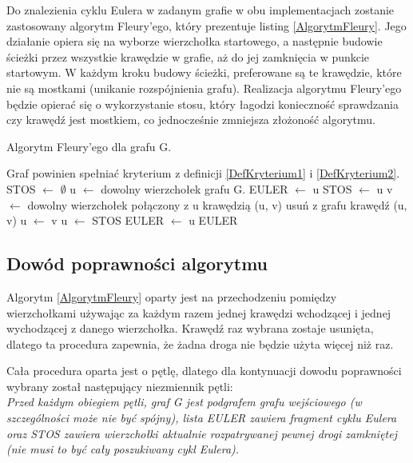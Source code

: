 Do znalezienia cyklu Eulera w zadanym grafie w obu implementacjach zostanie zastosowany algorytm Fleury'ego, który prezentuje listing \ref{AlgorytmFleury}.
Jego działanie opiera się na wyborze wierzchołka startowego, a następnie budowie ścieżki przez wszystkie krawędzie w grafie, aż do jej zamknięcia w punkcie startowym. 
W każdym kroku budowy ścieżki, preferowane są te krawędzie, które nie są mostkami (unikanie rozspójnienia grafu).
Realizacja algorytmu Fleury'ego będzie opierać się o wykorzystanie stosu, który łagodzi konieczność sprawdzania czy krawędź jest mostkiem, co jednocześnie zmniejsza złożoność algorytmu.

\begin{algorithm}
\caption{Algorytm Fleury'ego dla grafu G.}
\label{AlgorytmFleury}
\begin{algorithmic}
\Require Graf powinien spełniać kryterium z definicji \ref{DefKryterium1} i \ref{DefKryterium2}.
\State STOS $\gets$ $\emptyset$
\State u $\gets$ dowolny wierzchołek grafu G.
\State EULER $\gets$  u
\State
\Repeat
		\State STOS $\gets$ u
		\State v $\gets$ dowolny wierzchołek połączony z u krawędzią (u, v)
		\State usuń z grafu krawędź (u, v)
		\State u $\gets$ v
	\Else
		\State u $\gets$ STOS
		\State EULER $\gets$ u
	\EndIf
{}
\State
\State \Return EULER 
\end{algorithmic}
\end{algorithm}



\subsection{Dowód poprawności algorytmu}

Algorytm \ref{AlgorytmFleury} oparty jest na przechodzeniu pomiędzy wierzchołkami używając za każdym razem jednej krawędzi wchodzącej i jednej wychodzącej z danego wierzchołka. 
Krawędź raz wybrana zostaje usunięta, dlatego ta procedura zapewnia, że żadna droga nie będzie użyta więcej niż raz.

Cała procedura oparta jest o pętlę, dlatego dla kontynuacji dowodu poprawności wybrany został następujący niezmiennik pętli: \\
\textit{Przed każdym obiegiem pętli, graf G jest podgrafem grafu wejściowego (w szczególności może nie być spójny), lista EULER zawiera fragment cyklu Eulera oraz STOS zawiera wierzchołki aktualnie rozpatrywanej pewnej drogi zamkniętej (nie musi to być cały poszukiwany cykl Eulera).}

